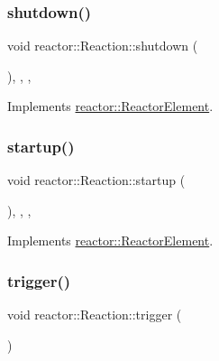 \mbox{\label{classreactor_1_1Reaction_ae4011cf04c0d7158ffd1360fb00bcc29}} 
\subsubsection{\texorpdfstring{shutdown()}{shutdown()}}
{\footnotesize\ttfamily void reactor\+::\+Reaction\+::shutdown (\begin{DoxyParamCaption}{ }\end{DoxyParamCaption})\hspace{0.3cm}{\ttfamily [inline]}, {\ttfamily [final]}, {\ttfamily [override]}, {\ttfamily [virtual]}}



Implements \hyperlink{classreactor_1_1ReactorElement_a8fce084bef582156979ebba56737e907}{reactor\+::\+Reactor\+Element}.

\mbox{\label{classreactor_1_1Reaction_a504359d36ac61662668787c9b650c314}} 
\subsubsection{\texorpdfstring{startup()}{startup()}}
{\footnotesize\ttfamily void reactor\+::\+Reaction\+::startup (\begin{DoxyParamCaption}{ }\end{DoxyParamCaption})\hspace{0.3cm}{\ttfamily [inline]}, {\ttfamily [final]}, {\ttfamily [override]}, {\ttfamily [virtual]}}



Implements \hyperlink{classreactor_1_1ReactorElement_a8cb574cb20ff963903ad905fb0a157e3}{reactor\+::\+Reactor\+Element}.

\mbox{\label{classreactor_1_1Reaction_a33e0f5fff73c2908547dd1c65219ded6}} 
\subsubsection{\texorpdfstring{trigger()}{trigger()}}
{\footnotesize\ttfamily void reactor\+::\+Reaction\+::trigger (\begin{DoxyParamCaption}{ }\end{DoxyParamCaption})}



